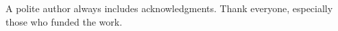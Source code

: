A polite author always includes acknowledgments.  Thank everyone,
especially those who funded the work. 

